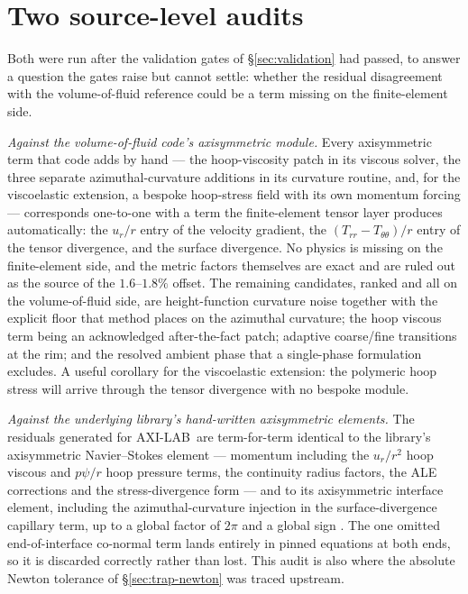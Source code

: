 \documentclass[11pt,a4paper]{article}
\newcommand{\LAB}{\textsf{AXI-LAB}}
\begin{document}
\appendix

\section{Two source-level audits}
\label{sec:audits}

Both were run after the validation gates of \S\ref{sec:validation} had passed,
to answer a question the gates raise but cannot settle: whether the residual
disagreement with the volume-of-fluid reference could be a term missing on the
finite-element side.

\emph{Against the volume-of-fluid code's axisymmetric module.} Every
axisymmetric term that code adds by hand --- the hoop-viscosity patch in its
viscous solver, the three separate azimuthal-curvature additions in its
curvature routine, and, for the viscoelastic extension, a bespoke hoop-stress
field with its own momentum forcing --- corresponds one-to-one with a term the
finite-element tensor layer produces automatically: the $u_{r}/r$ entry of the
velocity gradient, the $(T_{rr}-T_{\theta\theta})/r$ entry of the tensor
divergence, and the surface divergence. No physics is missing on the
finite-element side, and the metric factors themselves are exact and are ruled
out as the source of the $1.6$--$1.8\%$ offset. The remaining candidates, ranked
and all on the volume-of-fluid side, are height-function curvature noise
together with the explicit floor that method places on the azimuthal curvature;
the hoop viscous term being an acknowledged after-the-fact patch; adaptive
coarse/fine transitions at the rim; and the resolved ambient phase that a
single-phase formulation excludes. A useful corollary for the viscoelastic
extension: the polymeric hoop stress will arrive through the tensor divergence
with no bespoke module.

\emph{Against the underlying library's hand-written axisymmetric elements.} The
residuals generated for \LAB\ are term-for-term identical to the library's
axisymmetric Navier--Stokes element --- momentum including the $u_{r}/r^{2}$
hoop viscous and $p\psi/r$ hoop pressure terms, the continuity radius factors,
the ALE corrections and the stress-divergence form --- and to its axisymmetric
interface element, including the azimuthal-curvature injection in the
surface-divergence capillary term, up to a global factor of $2\pi$ and a global
sign \cite{heil2006}. The one omitted end-of-interface co-normal term lands
entirely in pinned equations at both ends, so it is discarded correctly rather
than lost. This audit is also where the absolute Newton tolerance of
\S\ref{sec:trap-newton} was traced upstream.

\begingroup
\let\oldthebibliography\thebibliography
\renewcommand{\thebibliography}[1]{%
  \oldthebibliography{#1}%
  \setlength{\itemsep}{0pt plus 0.2ex}%
  \setlength{\parskip}{0pt}}


\endgroup
\end{document}

